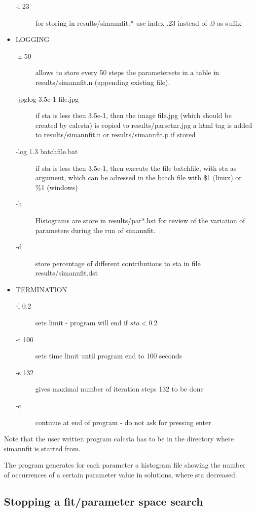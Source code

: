 \begin{itemize}
\begin{description}
\item[-i 23] for storing in results/simannfit.* use index .23 instead of .0 as suffix 
\end{description}
\item LOGGING 
\begin{description}
\item[-n 50]allows to store every 50 steps the parametersets in a table in  {\prg results/simannfit.n}
 (appending existing file).
\item[-jpglog 3.5e-1 file.jpg] if sta is less then 3.5e-1, then the image file.jpg 
            (which should be created by calcsta) is copied to results/parsetnr.jpg
            a html tag is added to results/simannfit.n or results/simannfit.p if 
	    stored
\item[-log 1.3 batchfile.bat] if sta is less then 3.5e-1, then execute the file 
             batchfile, with sta as argument, which can be adressed in the batch
	     file with \$1 (linux) or  \%1 (windows)
\item[-h]       Histograms are store in results/par*.hst for review of the variation 
             of parameters during the run of simannfit. 
\item[-d ]      store percentage of different contributions to sta in file results/simannfit.dst 
\end{description}
\item TERMINATION 
\begin{description}
\item[-l 0.2] sets limit - program will end if $sta<0.2$
\item[-t 100] sets time limit until program end to 100 seconds
\item[-s 132] gives maximal number of iteration steps 132 to be done
\item[-c] continue at end of program - do not ask for pressing enter 
\end{description}
\end{itemize}
Note that the user written program {\prg calcsta} has to be in the
directory where {\prg simannfit} is started from.

The program generates for each parameter a histogram file showing the number of occurrences
of a certain parameter value in solutions, where sta decreased.

\subsection{Stopping a fit/parameter space search}

